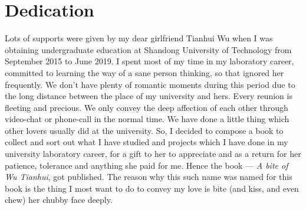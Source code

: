 \chapter*{Dedication}

\begin{quote}
    \medskip
\end{quote}

Lots of supports were given by my dear girlfriend Tianhui Wu when I was obtaining undergraduate education at Shandong University of Technology from September 2015 to June 2019. I spent most of my time in my laboratory career, committed to learning the way of a sane person thinking, so that ignored her frequently. We don't have plenty of romantic moments during this period due to the long distance between the place of my university and hers. Every reunion is fleeting and precious. We only convey the deep affection of each other through video-chat or phone-call in the normal time. We have done a little thing which other lovers usually did at the university. So, I decided to compose a book to collect and sort out what I have studied and projects which I have done in my university laboratory career, for a gift to her to appreciate and as a return for her patience, tolerance and anything she paid for me. Hence the book --- \textsl{A bite of Wu Tianhui}, got published. The reason why this such name was named for this book is the thing I most want to do to convey my love is bite (and kiss, and even chew) her chubby face deeply. \\

